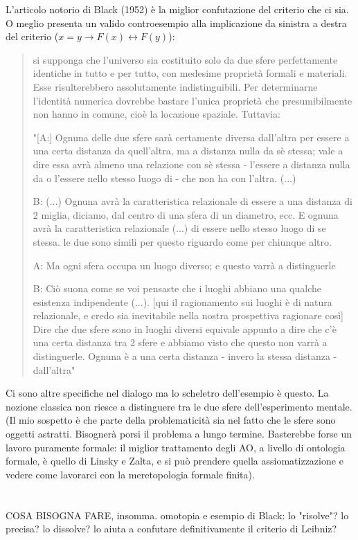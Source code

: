 \documentclass{amsart}
\begin{document}
L'articolo notorio di Black (1952) è la miglior confutazione del criterio che ci sia. O meglio presenta un valido controesempio alla implicazione da sinistra a destra del criterio ($x=y \rightarrow F(x) \leftrightarrow F(y)$):
\begin{quote}
si supponga che l'universo sia costituito solo da due sfere perfettamente identiche in tutto e per tutto, con medesime proprietà formali e materiali. Esse risulterebbero assolutamente indistinguibili. Per determinarne l'identità numerica dovrebbe bastare l'unica proprietà che presumibilmente non hanno in comune, cioè la locazione spaziale. Tuttavia:

"[A:] Ognuna delle due sfere sarà certamente diversa dall'altra per essere a una certa distanza da quell'altra, ma a distanza nulla da sè stessa; vale a dire essa avrà almeno una relazione con sè stessa - l'essere a distanza nulla da o l'essere nello stesso luogo di - che non ha con l'altra. (...)   

B: (...) Ognuna avrà la caratteristica relazionale di essere a una distanza di 2 miglia, diciamo, dal centro di una sfera di un diametro, ecc. E ognuna avrà la caratteristica relazionale (...) di essere nello stesso luogo di se stessa. le due sono simili per questo riguardo come per chiunque altro. 

A: Ma ogni sfera occupa un luogo diverso; e questo varrà a distinguerle

B: Ciò suona come se voi pensaste che i luoghi abbiano una qualche esistenza indipendente (...). [qui il ragionamento sui luoghi è di natura relazionale, e credo sia inevitabile nella nostra prospettiva ragionare così] Dire che due sfere sono in luoghi diversi equivale appunto a dire che c'è una certa distanza tra 2 sfere e abbiamo visto che questo non varrà a distinguerle. Ognuna è a una certa distanza - invero la stessa distanza - dall'altra"
\end{quote}
Ci sono altre specifiche nel dialogo ma lo scheletro dell'esempio è questo. La nozione classica non riesce a distinguere tra le due sfere dell'esperimento mentale. (Il mio sospetto è che parte della problematicità sia nel fatto che le sfere sono oggetti astratti. Bisognerà porsi il problema a lungo termine. Basterebbe forse un lavoro puramente formale: il miglior trattamento degli AO, a livello di ontologia formale, è quello di Linsky e Zalta, e si può prendere quella assiomatizzazione e vedere come lavorarci con la meretopologia formale finita). 
\section{}
COSA BISOGNA FARE, insomma.
omotopia e esempio di Black: lo "risolve"? lo precisa? lo dissolve? lo aiuta a confutare definitivamente il criterio di Leibniz?
\end{document}
